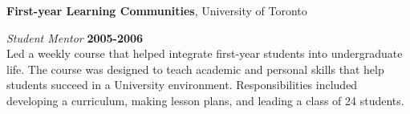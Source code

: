 \documentclass[margin,line]{res}
\begin{document}
\begin{resume}
{\bf First-year Learning Communities}, University of Toronto

\vspace{-.3cm}
{\em Student Mentor} \hfill {\bf 2005-2006}\\
Led a weekly course that helped integrate first-year students into undergraduate life.
The course was designed to teach academic and personal skills that help students succeed in a University environment.
Responsibilities included developing a curriculum, making lesson plans, and leading a class of 24 students.

\end{resume}
\end{document}
